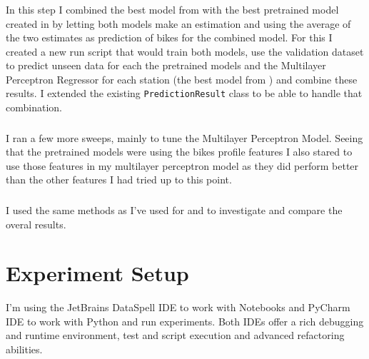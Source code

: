 \documentclass[a4paper]{article}
\begin{document}
    \subsubsection*{}
    In this step I combined the best model from  with the best pretrained model created in 
    by letting both models make an estimation and using the average of the two estimates as prediction of bikes for the combined model.
    For this I created a new run script that would train both models, use the validation dataset to predict unseen data for each the pretrained models
    and the Multilayer Perceptron Regressor for  each station (the best model from ) and
    combine these results. I extended the existing \texttt{PredictionResult} class to be able to handle that combination.

    \subsubsection*{}
    I ran a few more sweeps, mainly to tune the Multilayer Perceptron Model. Seeing that the pretrained
    models were using the bikes profile features I also stared to use those features in my multilayer perceptron model as
    they did perform better than the other features I had tried up to this point.

    \subsubsection*{}
    I used the same methods as I've used for  and  to investigate and compare the
    overal results.



    \section{Experiment Setup}\label{sec:experiment-setup}
    I'm using the JetBrains DataSpell IDE to work with Notebooks and PyCharm IDE to work with Python and run experiments.
    Both IDEs offer
    a rich debugging and runtime environment, test and script execution and advanced refactoring abilities.

    \subsection*{}
\end{document}
